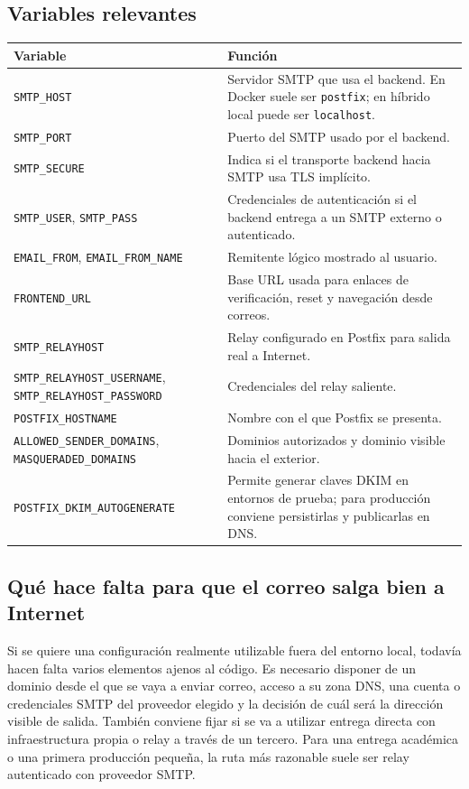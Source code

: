 \documentclass[11pt, a4paper]{article}
\begin{document}
\subsection{Variables relevantes}

\begin{longtable}{|p{5cm}|p{9cm}|}
\hline
\textbf{Variable} & \textbf{Función} \\
\hline
\texttt{SMTP\_HOST} & Servidor SMTP que usa el backend. En Docker suele ser \texttt{postfix}; en híbrido local puede ser \texttt{localhost}. \\
\hline
\texttt{SMTP\_PORT} & Puerto del SMTP usado por el backend. \\
\hline
\texttt{SMTP\_SECURE} & Indica si el transporte backend hacia SMTP usa TLS implícito. \\
\hline
\texttt{SMTP\_USER}, \texttt{SMTP\_PASS} & Credenciales de autenticación si el backend entrega a un SMTP externo o autenticado. \\
\hline
\texttt{EMAIL\_FROM}, \texttt{EMAIL\_FROM\_NAME} & Remitente lógico mostrado al usuario. \\
\hline
\texttt{FRONTEND\_URL} & Base URL usada para enlaces de verificación, reset y navegación desde correos. \\
\hline
\texttt{SMTP\_RELAYHOST} & Relay configurado en Postfix para salida real a Internet. \\
\hline
\texttt{SMTP\_RELAYHOST\_USERNAME}, \texttt{SMTP\_RELAYHOST\_PASSWORD} & Credenciales del relay saliente. \\
\hline
\texttt{POSTFIX\_HOSTNAME} & Nombre con el que Postfix se presenta. \\
\hline
\texttt{ALLOWED\_SENDER\_DOMAINS}, \texttt{MASQUERADED\_DOMAINS} & Dominios autorizados y dominio visible hacia el exterior. \\
\hline
\texttt{POSTFIX\_DKIM\_AUTOGENERATE} & Permite generar claves DKIM en entornos de prueba; para producción conviene persistirlas y publicarlas en DNS. \\
\hline
\end{longtable}

\subsection{Qué hace falta para que el correo salga bien a Internet}

Si se quiere una configuración realmente utilizable fuera del entorno local, todavía hacen falta varios elementos ajenos al código. Es necesario disponer de un dominio desde el que se vaya a enviar correo, acceso a su zona DNS, una cuenta o credenciales SMTP del proveedor elegido y la decisión de cuál será la dirección visible de salida. También conviene fijar si se va a utilizar entrega directa con infraestructura propia o relay a través de un tercero. Para una entrega académica o una primera producción pequeña, la ruta más razonable suele ser relay autenticado con proveedor SMTP.
\end{document}
